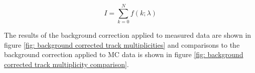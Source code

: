 \begin{equation}
	I = \sum^{N}_{k=0} f(k; \lambda)
\end{equation}

The results of the background correction applied to measured data are shown in figure \ref{fig: background corrected track multiplicities} and comparisons to the background correction applied to MC data is shown in figure \ref{fig: background corrected track multiplicity comparison}.

